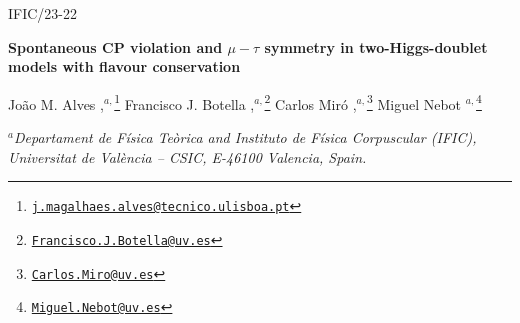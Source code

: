 \documentclass[12pt,a4paper]{article}
\begin{document}
\hfill\begin{minipage}[r]{0.3\textwidth}\begin{flushright} IFIC/23-22 \end{flushright} \end{minipage}

\vspace{0.50cm}
\begin{center}
{\large{\textbf{
Spontaneous CP violation and $\mu-\tau$ symmetry in two-Higgs-doublet models with flavour conservation}}}

\renewcommand*{\thefootnote}{\fnsymbol{footnote}}
\vspace{0.50cm}
João M. Alves ,$^{a,}$\footnote{\href{mailto:j.magalhaes.alves@tecnico.ulisboa.pt}{\texttt{j.magalhaes.alves@tecnico.ulisboa.pt}}}
Francisco J. Botella ,$^{a,}$\footnote{\href{mailto:Francisco.J.Botella@uv.es}{\texttt{Francisco.J.Botella@uv.es}}}
Carlos Miró ,$^{a,}$\footnote{\href{mailto:Carlos.Miro@uv.es}{\texttt{Carlos.Miro@uv.es}}}
Miguel Nebot  $^{a,}$\footnote{\href{mailto:Miguel.Nebot@uv.es}{\texttt{Miguel.Nebot@uv.es}}}
\renewcommand*{\thefootnote}{\arabic{footnote}}
\setcounter{footnote}{0}

\vspace{0.50cm}
\textit{$^a$Departament de Física Teòrica and Instituto de Física Corpuscular (IFIC),\\ Universitat de València -- CSIC, E-46100 Valencia, Spain.}\\
\end{center}

\vspace{0.50cm}
\begin{abstract}
In multi-Higgs-doublet models, requiring simultaneously that (i) CP violation only arises spontaneously, (ii) tree level scalar flavour changing couplings are absent and (iii) the fermion mixing matrix is CP violating, can only be achieved in a very specific manner. A general approach with new clarifying insights on the question is presented. Considering the quark sector, that peculiar possibility is not viable on phenomenological grounds. We show that, considering the lepton sector, it is highly interesting and leads to viable models with $\mu-\tau$ symmetric PMNS matrices. Phenomenological implications of the models, both for Dirac and Majorana (in a type I seesaw scenario) neutrinos, are analysed.
\end{abstract}
\end{document}
